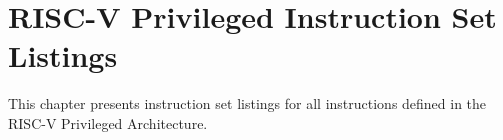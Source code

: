 \chapter{RISC-V Privileged Instruction Set Listings}

This chapter presents instruction set listings for all instructions
defined in the RISC-V Privileged Architecture.


